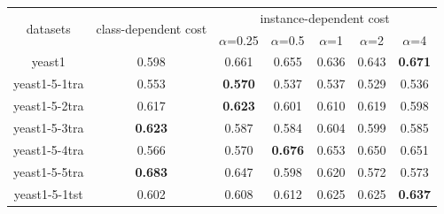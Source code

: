 \documentclass{article}
\begin{document}
\begin{table}[!ht]
	\centering
	\begin{tabular}{|c||c|ccccc|}
		\hline
		\multirow{2}{*}{datasets} & \multirow{2}{*}{class-dependent cost} & \multicolumn{5}{c|}{instance-dependent cost}                                                                                                                           \\ \cline{3-7} 
		&                                       & \multicolumn{1}{c|}{$\alpha$=0.25}         & \multicolumn{1}{c|}{$\alpha$=0.5}          & \multicolumn{1}{c|}{$\alpha$=1}            & \multicolumn{1}{c|}{$\alpha$=2}            & $\alpha$=4            \\ \hline \hline
	yeast1                    & 0.598                                 & \multicolumn{1}{c|}{0.661}          & \multicolumn{1}{c|}{0.655}          & \multicolumn{1}{c|}{0.636}      & \multicolumn{1}{c|}{0.643}      & \textbf{0.671} \\ \hline
	yeast1-5-1tra             & 0.553                                 & \multicolumn{1}{c|}{\textbf{0.570}} & \multicolumn{1}{c|}{0.537}          & \multicolumn{1}{c|}{0.537}      & \multicolumn{1}{c|}{0.529}      & 0.536          \\ \hline
	yeast1-5-2tra             & 0.617                                 & \multicolumn{1}{c|}{\textbf{0.623}} & \multicolumn{1}{c|}{0.601}          & \multicolumn{1}{c|}{0.610}      & \multicolumn{1}{c|}{0.619}      & 0.598          \\ \hline
	yeast1-5-3tra             & \textbf{0.623}                        & \multicolumn{1}{c|}{0.587}          & \multicolumn{1}{c|}{0.584}          & \multicolumn{1}{c|}{0.604}      & \multicolumn{1}{c|}{0.599}      & 0.585          \\ \hline
	yeast1-5-4tra             & 0.566                                 & \multicolumn{1}{c|}{0.570}          & \multicolumn{1}{c|}{\textbf{0.676}} & \multicolumn{1}{c|}{0.653}      & \multicolumn{1}{c|}{0.650}      & 0.651          \\ \hline
	yeast1-5-5tra             & \textbf{0.683}                        & \multicolumn{1}{c|}{0.647}          & \multicolumn{1}{c|}{0.598}          & \multicolumn{1}{c|}{0.620}      & \multicolumn{1}{c|}{0.572}      & 0.573          \\ \hline
	yeast1-5-1tst             & 0.602                                 & \multicolumn{1}{c|}{0.608}          & \multicolumn{1}{c|}{0.612}          & \multicolumn{1}{c|}{0.625}      & \multicolumn{1}{c|}{0.625}      & \textbf{0.637} \\ \hline

\end{tabular}
\end{table}
\end{document}
